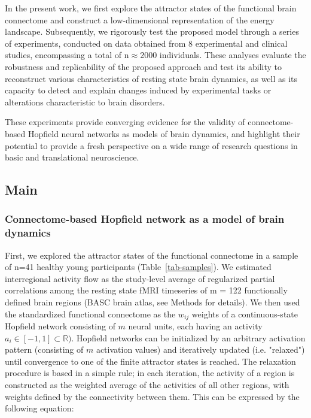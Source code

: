 \documentclass{article}
\begin{document}
In the present work, we first explore the attractor states of the functional brain connectome and construct a
low-dimensional representation of the energy landscape.
Subsequently, we rigorously test the proposed model through a series of experiments, conducted on data obtained
from 8 experimental and clinical studies, encompassing a total of n$\approx$2000 individuals.
These analyses evaluate the robustness and replicability of the proposed approach and test its ability to reconstruct
various characteristics of resting state brain dynamics, as well as its capacity to detect and explain changes induced
by experimental tasks or alterations characteristic to brain disorders.

These experiments provide converging evidence for the validity of connectome-based Hopfield neural networks as models
of brain dynamics, and highlight their potential to provide a fresh perspective on a wide range of research questions
in basic and translational neuroscience.

\subsection{Main}\label{Main}

\subsubsection{Connectome-based Hopfield network as a model of brain dynamics}\label{Connectome-based Hopfield network as a model of brain dynamics}

First, we explored the attractor states of the functional connectome in a sample of n=41 healthy young
participants (Table~\ref{tab-samples}). We estimated interregional activity flow \citep{cole2016activity, ito2017cognitive}
as the study-level average of regularized partial correlations among the resting state fMRI timeseries of m = 122
functionally defined brain regions (BASC brain atlas, see Methods for details). We then used the standardized
functional connectome as the $w_{ij}$  weights of a continuous-state Hopfield network
\citep{hopfield1982neural, koiran1994dynamics} consisting of $m$ neural units, each having an activity
$a_i \in [ -1,1] \subset \mathbb{R})$. Hopfield networks can be initialized by an arbitrary activation pattern (consisting of
$m$ activation values) and iteratively updated (i.e. "relaxed") until convergence to one of the finite attractor states is reached. The relaxation procedure is based in a simple rule; in each iteration, the activity of a region is constructed as the weighted average of the activities of all other regions, with weights defined by the connectivity between them.
This can be expressed by the following equation:
\end{document}
